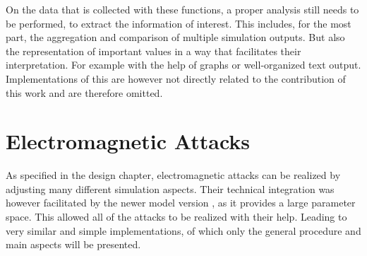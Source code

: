     On the data that is collected with these functions, a proper analysis still needs to be performed, to extract the information of interest. This includes, for the most part, the aggregation and comparison of multiple simulation outputs. But also the representation of important values in a way that facilitates their interpretation. For example with the help of graphs or well-organized text output. Implementations of this are however not directly related to the contribution of this work and are therefore omitted.




\section{Electromagnetic Attacks}
As specified in the design chapter, electromagnetic attacks can be realized by adjusting many different simulation aspects. Their technical integration was however facilitated by the newer model version \cite{HippSimModel.2}, as it provides a large parameter space. This allowed all of the attacks to be realized with their help. Leading to very similar and simple implementations, of which only the general procedure and main aspects will be presented.

